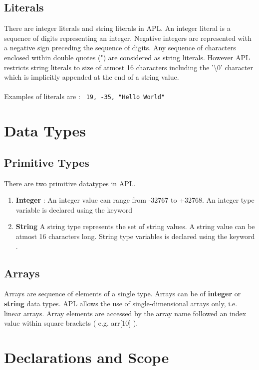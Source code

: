 \documentclass[11pt]{article}
\begin{document}
\subsection{Literals}
There are integer literals and string literals in APL. An integer literal is a sequence of digits representing an integer.
Negative integers are represented with a negative sign preceding the sequence of digits. Any sequence of characters enclosed within double quotes (") are considered as string literals. However APL restricts string literals to size of atmost 16 characters including the '\textbackslash 0' character which is implicitly appended at the end of a string value. 
\\
\\
Examples of literals are : \texttt{
 19, -35, "Hello World"}


\section{Data Types}

\subsection{Primitive Types}
There are two primitive datatypes in APL. 
\begin{enumerate}

\item \textbf{Integer} : An integer value can range from -32767 to +32768. An integer type variable is declared using the keyword 
\item \textbf{String}  
A string type represents the set of string values. A string value can be atmost 16 characters long. String type variables is declared using the keyword .
\end{enumerate}


\subsection{Arrays}
Arrays are  sequence of elements of a single type. Arrays can be of \textbf{integer} or \textbf{string} data types.
APL allows the use of single-dimensional arrays only, i.e. linear arrays. Array elements are accessed by the array name followed an index value within square brackets ( e.g. arr[10] ).


\section{Declarations and Scope}
\end{document}
